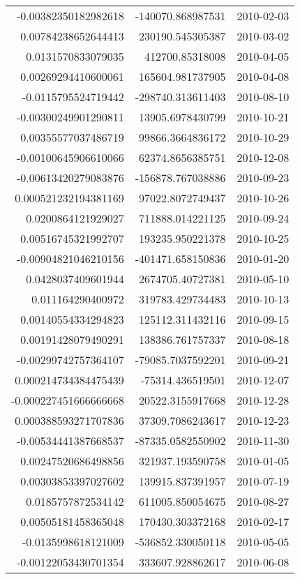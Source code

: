 \begin{tabular}{r | r | l}
-0.00382350182982618 & -140070.868987531 & 2010-02-03 \\
0.00784238652644413 & 230190.545305387 & 2010-03-02 \\
0.0131570833079035 & 412700.85318008 & 2010-04-05 \\
0.00269294410600061 & 165604.981737905 & 2010-04-08 \\
-0.0115795524719442 & -298740.313611403 & 2010-08-10 \\
-0.00300249901290811 & 13905.6978430799 & 2010-10-21 \\
0.00355577037486719 & 99866.3664836172 & 2010-10-29 \\
-0.00100645906610066 & 62374.8656385751 & 2010-12-08 \\
-0.00613420279083876 & -156878.767038886 & 2010-09-23 \\
0.000521232194381169 & 97022.8072749437 & 2010-10-26 \\
0.0200864121929027 & 711888.014221125 & 2010-09-24 \\
0.00516745321992707 & 193235.950221378 & 2010-10-25 \\
-0.00904821046210156 & -401471.658150836 & 2010-01-20 \\
0.0428037409601944 & 2674705.40727381 & 2010-05-10 \\
0.011164290400972 & 319783.429734483 & 2010-10-13 \\
0.00140554334294823 & 125112.311432116 & 2010-09-15 \\
0.00191428079490291 & 138386.761757337 & 2010-08-18 \\
-0.00299742757364107 & -79085.7037592201 & 2010-09-21 \\
0.000214734384475439 & -75314.436519501 & 2010-12-07 \\
-0.000227451666666668 & 20522.3155917668 & 2010-12-28 \\
0.000388593271707836 & 37309.7086243617 & 2010-12-23 \\
-0.00534441387668537 & -87335.0582550902 & 2010-11-30 \\
0.00247520686498856 & 321937.193590758 & 2010-01-05 \\
0.00303853397027602 & 139915.837391957 & 2010-07-19 \\
0.0185757872534142 & 611005.850054675 & 2010-08-27 \\
0.00505181458365048 & 170430.303372168 & 2010-02-17 \\
-0.0135998618121009 & -536852.330050118 & 2010-05-05 \\
-0.00122053430701354 & 333607.928862617 & 2010-06-08 \\

\end{tabular}
